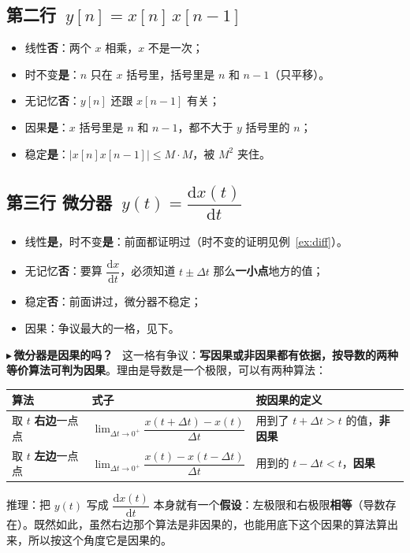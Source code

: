 \documentclass[UTF8,a4paper,11pt]{ctexart}
\newcounter{ex}[section]
\newcommand{\point}[1]{\par\addvspace{1ex}\noindent\textcolor{ptteal}{$\blacktriangleright$\,\textbf{#1}}\ }
\begin{document}
\subsection{第二行~\texorpdfstring{$y[n]=x[n]\,x[n-1]$}{y[n]=x[n]x[n-1]}}
\begin{itemize}[nosep]
\item 线性\textbf{否}：两个 $x$ 相乘，$x$ 不是一次；
\item 时不变\textbf{是}：$n$ 只在 $x$ 括号里，括号里是 $n$ 和 $n-1$（只平移）。
\item 无记忆\textbf{否}：$y[n]$ 还跟 $x[n-1]$ 有关；
\item 因果\textbf{是}：$x$ 括号里是 $n$ 和 $n-1$，都不大于 $y$ 括号里的 $n$；
\item 稳定\textbf{是}：$|x[n]x[n-1]|\le M\cdot M$，被 $M^2$ 夹住。
\end{itemize}

\subsection{第三行 微分器~\texorpdfstring{$y(t)=\dfrac{\mathrm{d}x(t)}{\mathrm{d}t}$}{y(t)=dx(t)/dt}}
\begin{itemize}[nosep]
\item 线性\textbf{是}，时不变\textbf{是}：前面都证明过（时不变的证明见例~\ref{ex:diff}）。
\item 无记忆\textbf{否}：要算 $\dfrac{\mathrm{d}x}{\mathrm{d}t}$，必须知道 $t\pm\Delta t$ 那么\textbf{一小点}地方的值；
\item 稳定\textbf{否}：前面讲过，微分器不稳定；
\item 因果：争议最大的一格，见下。
\end{itemize}

\point{微分器是因果的吗？}
这一格有争议：\textbf{写因果或非因果都有依据，按导数的两种等价算法可判为因果}。理由是导数是一个极限，可以有两种算法：

\begin{center}
\renewcommand{\arraystretch}{1.3}
\begin{tabular}{@{}p{3.8cm}p{5.6cm}p{4.2cm}@{}}
\toprule
算法 & 式子 & 按因果的定义\\
\midrule
取 $t$ \textbf{右边}一点点 & $\displaystyle\lim_{\Delta t\to0^+}\dfrac{x(t+\Delta t)-x(t)}{\Delta t}$ & 用到了 $t+\Delta t>t$ 的值，\textbf{非因果}\\
取 $t$ \textbf{左边}一点点 & $\displaystyle\lim_{\Delta t\to0^+}\dfrac{x(t)-x(t-\Delta t)}{\Delta t}$ & 用到的 $t-\Delta t<t$，\textbf{因果}\\
\bottomrule
\end{tabular}
\end{center}
推理：把 $y(t)$ 写成 $\dfrac{\mathrm{d}x(t)}{\mathrm{d}t}$ 本身就有一个\textbf{假设}：左极限和右极限\textbf{相等}（导数存在）。既然如此，虽然右边那个算法是非因果的，也能用底下这个因果的算法算出来，所以按这个角度它是因果的。
\end{document}
